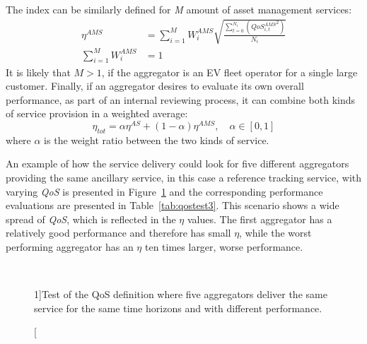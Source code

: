 The index can be similarly defined for \emph{M} amount of asset management services:
\begin{align}\label{eq:MAINetaAMS}
\eta^{AMS} &= \sum^{M}_{i=1} W^{AMS}_i \sqrt{\frac{\sum^{N_i}_{t=0} \left( {QoS^{AMS}_{i,t}}^{2} \right)}{N_i}}\\
\sum_{i=1}^M W^{AMS}_i &= 1 \label{eq:wams}
\end{align}
It is likely that $M > 1$, \eg if the aggregator is an EV fleet operator for a single large customer. Finally, if an aggregator desires to evaluate its own overall performance, \eg as part of an internal reviewing process, it can combine both kinds of service provision in a weighted average:
\begin{equation}
\eta_{tot} = \alpha \eta^{AS} + (1-\alpha) \eta^{AMS}, \quad \alpha \in [0,1]
\end{equation}
where $\alpha$ is the weight ratio  between the two kinds of service. 

An example of how the service delivery could look for five different aggregators providing the same ancillary service, in this case a reference tracking service, with varying \emph{QoS} is presented in Figure~\ref{fig:indextest3} and the corresponding performance evaluations are presented in Table~\ref{tab:qostest3}. This scenario shows a wide spread of \emph{QoS}, which is reflected in the $\eta$ values. The first aggregator has a relatively good performance and therefore has small $\eta$, while the worst performing aggregator has an $\eta$ ten times larger, \ie worse performance.

\begin{figure}[htb!]
\centering
{} \\
\caption[][1\baselineskip]{Test of the QoS definition where five aggregators deliver the same service for the same time horizons and with different performance.}
\label{fig:indextest3}
\end{figure}

